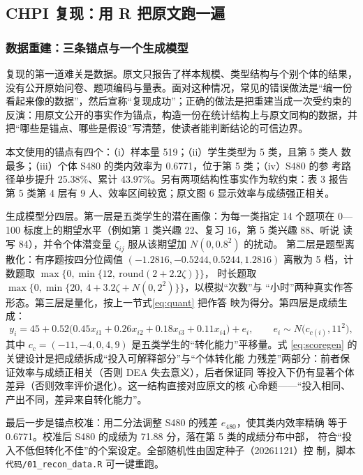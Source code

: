 \subsection{CHPI 复现：用 R 把原文跑一遍}

\subsubsection{数据重建：三条锚点与一个生成模型}

复现的第一道难关是数据。原文只报告了样本规模、类型结构与个别个体的结果，
没有公开原始问卷、题项编码与量表。面对这种情况，常见的错误做法是“编一份
看起来像的数据”，然后宣称“复现成功”；正确的做法是把重建当成一次受约束的
反演：用原文公开的事实作为锚点，构造一份在统计结构上与原文同构的数据，并
把“哪些是锚点、哪些是假设”写清楚，使读者能判断结论的可信边界。

本文使用的锚点有四个：（i）样本量 519；（ii）学生类型为 5 类，且第 5 类人
数最多；（iii）个体 S480 的类内效率为 0.6771，位于第 5 类；（iv）S480 的参
考路径单步提升 25.38\%、累计 43.97\%。另有两项结构性事实作为软约束：表 3
报告第 5 类第 4 层有 9 人、效率区间较宽；原文图 6 显示效率与成绩强正相关。

生成模型分四层。第一层是五类学生的潜在画像：为每一类指定 14 个题项在
0—100 标度上的期望水平（例如第 1 类兴趣 22、复习 16，第 5 类兴趣 88、听说
读写 84），并令个体潜变量 $\zeta_{ij}$ 服从该期望加 $N(0,0.8^2)$ 的扰动。
第二层是题型离散化：有序题按四分位阈值 $(-1.2816,-0.5244,0.5244,1.2816)$
离散为 5 档，计数题取 $\max\{0,\min\{12,\ \mathrm{round}(2+2.2\zeta)\}\}$，
时长题取 $\max\{0,\min\{20,\ 4+3.2\zeta+N(0,2^2)\}\}$，以模拟“次数”与
“小时”两种真实作答形态。第三层是量化，按上一节式\eqref{eq:quant} 把作答
映为得分。第四层是成绩生成：
\begin{equation}
y_i=45+0.52\bigl(0.45x_{i1}+0.26x_{i2}+0.18x_{i3}+0.11x_{i4}\bigr)+e_i,
\qquad e_i\sim N\bigl(c_{c(i)},11^2\bigr),
\label{eq:scoregen}
\end{equation}
其中 $c_{c}=(-11,-4,0,4,9)$ 是五类学生的“转化能力”平移量。式
\eqref{eq:scoregen} 的关键设计是把成绩拆成“投入可解释部分”与“个体转化能
力残差”两部分：前者保证效率与成绩正相关（否则 DEA 失去意义），后者保证同
等投入下仍有显著个体差异（否则效率评价退化）。这一结构直接对应原文的核
心命题——“投入相同、产出不同，差异来自转化能力”。

最后一步是锚点校准：用二分法调整 S480 的残差 $e_{480}$，使其类内效率精确
等于 0.6771。校准后 S480 的成绩为 71.88 分，落在第 5 类的成绩分布中部，
符合“投入不低但转化不佳”的个案设定。全部随机性由固定种子（20261121）控
制，脚本 \texttt{代码/01\_recon\_data.R} 可一键重跑。

